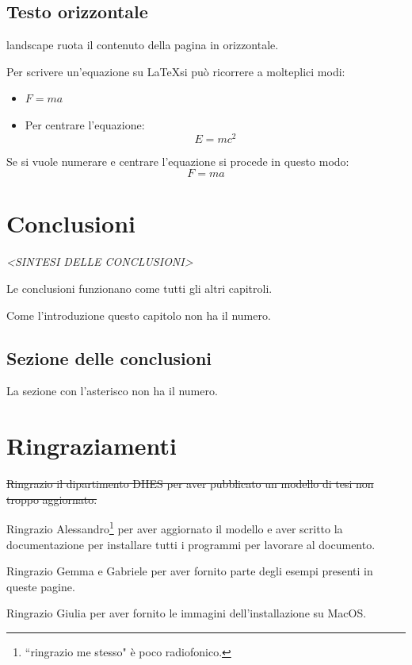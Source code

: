 \documentclass[envcountsame,envcountchap]{svmono}
\begin{document}
\newpage
\begin{landscape}
    \section{Testo orizzontale}
    landscape ruota il contenuto della pagina in orizzontale.
    
    Per scrivere un'equazione su \LaTeX si può ricorrere a molteplici modi:
    \begin{itemize}
        \item $F=ma$
        \item Per centrare l'equazione:
        \[E=mc^2\]
    \end{itemize}
    Se si vuole numerare e centrare l'equazione si procede in questo modo:
    \begin{equation}
        F=ma 
    \end{equation}

\end{landscape}
    


\chapter*{Conclusioni}

\vspace{2cm}

\begin{flushright}
 \textit{<SINTESI DELLE CONCLUSIONI>}
\end{flushright}

\vspace{0.5cm}

Le conclusioni funzionano come tutti gli altri capitroli.

Come l'introduzione questo capitolo non ha il numero.

\section*{Sezione delle conclusioni}
La sezione con l'asterisco non ha il numero.

\chapter*{Ringraziamenti}

\sout{Ringrazio il dipartimento DIIES per aver pubblicato un modello di tesi non troppo aggiornato.}

Ringrazio Alessandro\footnote{``ringrazio me stesso" è poco radiofonico.}
per aver aggiornato il modello e aver scritto la documentazione
per installare tutti i programmi per lavorare al documento.

Ringrazio Gemma e Gabriele per aver fornito parte degli esempi presenti in queste pagine.

Ringrazio Giulia per aver fornito le immagini dell'installazione su MacOS.






\end{document}
